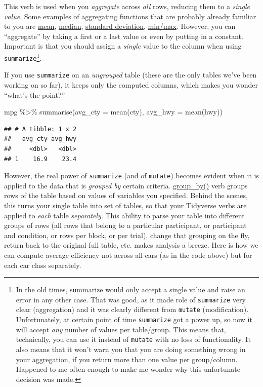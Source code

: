 \documentclass[
]{book}
\newenvironment{Shaded}{\begin{snugshade}}{\end{snugshade}}
\newcommand{\AttributeTok}[1]{\textcolor[rgb]{0.77,0.63,0.00}{#1}}
\newcommand{\FunctionTok}[1]{\textcolor[rgb]{0.00,0.00,0.00}{#1}}
\newcommand{\NormalTok}[1]{#1}
\newcommand{\SpecialCharTok}[1]{\textcolor[rgb]{0.00,0.00,0.00}{#1}}
\begin{document}
This verb is used when you \emph{aggregate} across \emph{all} rows, reducing them to a \emph{single value}. Some examples of aggregating functions that are probably already familiar to you are \href{https://stat.ethz.ch/R-manual/R-devel/library/base/html/mean.html}{mean}, \href{https://stat.ethz.ch/R-manual/R-devel/library/stats/html/median.html}{median}, \href{https://stat.ethz.ch/R-manual/R-devel/library/stats/html/sd.html}{standard deviation}, \href{https://stat.ethz.ch/R-manual/R-patched/library/base/html/Extremes.html}{min/max}. However, you can ``aggregate'' by taking a first or a last value or even by putting in a constant. Important is that you should assign a \emph{single} value to the column when using \texttt{summarize}\footnote{In the old times, summarize would only accept a single value and raise an error in any other case. That was good, as it made role of \texttt{summarize} very clear (aggregation) and it was clearly different from \texttt{mutate} (modification). Unfortunately, at certain point of time \texttt{summarize} got a power up, so now it will accept \emph{any} number of values per table/group. This means that, technically, you can use it instead of \texttt{mutate} with no loss of functionality. It also means that it won't warn you that you are doing something wrong in your aggregation, if you return more than one value per group/column. Happened to me often enough to make me wonder why this unfortunate decision was made.}.

If you use \texttt{summarize} on an \emph{ungrouped} table (these are the only tables we've been working on so far), it keeps only the computed columns, which makes you wonder ``what's the point?''

\begin{Shaded}
\begin{Highlighting}[]
\NormalTok{mpg }\SpecialCharTok{\%\textgreater{}\%}
  \FunctionTok{summarise}\NormalTok{(}\AttributeTok{avg\_cty =} \FunctionTok{mean}\NormalTok{(cty),}
            \AttributeTok{avg\_hwy =} \FunctionTok{mean}\NormalTok{(hwy))}
\end{Highlighting}
\end{Shaded}

\begin{verbatim}
## # A tibble: 1 x 2
##   avg_cty avg_hwy
##     <dbl>   <dbl>
## 1    16.9    23.4
\end{verbatim}

However, the real power of \texttt{summarize} (and of \texttt{mutate}) becomes evident when it is applied to the data that is \emph{grouped by} certain criteria. \href{https://dplyr.tidyverse.org/reference/group_by.html}{group\_by()} verb groups rows of the table based on values of variables you specified. Behind the scenes, this turns your single table into set of tables, so that your Tidyverse verbs are applied to \emph{each} table \emph{separately}. This ability to parse your table into different groups of rows (all rows that belong to a particular participant, or participant and condition, or rows per block, or per trial), change that grouping on the fly, return back to the original full table, etc. makes analysis a breeze. Here is how we can compute average efficiency not across all cars (as in the code above) but for each car class separately.
\end{document}
